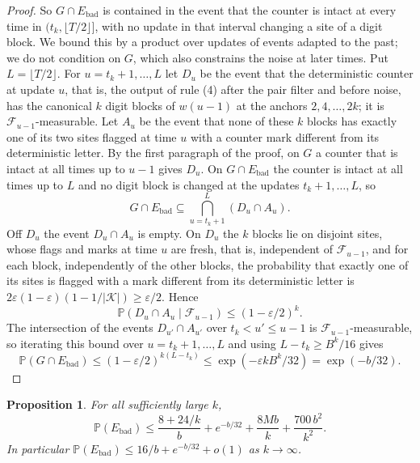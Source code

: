 \documentclass[11pt]{article}
\theoremstyle{plain}
\newtheorem{proposition}[theorem]{Proposition}
\theoremstyle{definition}
\theoremstyle{remark}
\newcommand{\Prob}{\mathbb P}
\newcommand{\eps}{\varepsilon}
\newcommand{\Ks}{\mathcal K}
\newcommand{\cF}{\mathcal F}
\begin{document}
\begin{proof}
So $G\cap E_{\mathrm{bad}}$ is contained in the event that the counter is intact at every time in $(t_k,\lfloor T/2\rfloor]$, with no update in that interval changing a site of a digit block. We bound this by a product over updates of events adapted to the past; we do not condition on $G$, which also constrains the noise at later times. Put $L=\lfloor T/2\rfloor$. For $u=t_k+1,\dots,L$ let $D_u$ be the event that the deterministic counter at update $u$, that is, the output of rule (4) after the pair filter and before noise, has the canonical $k$ digit blocks of $w(u-1)$ at the anchors $2,4,\dots,2k$; it is $\cF_{u-1}$-measurable. Let $A_u$ be the event that none of these $k$ blocks has exactly one of its two sites flagged at time $u$ with a counter mark different from its deterministic letter. By the first paragraph of the proof, on $G$ a counter that is intact at all times up to $u-1$ gives $D_u$. On $G\cap E_{\mathrm{bad}}$ the counter is intact at all times up to $L$ and no digit block is changed at the updates $t_k+1,\dots,L$, so
\[
G\cap E_{\mathrm{bad}}\subseteq\bigcap_{u=t_k+1}^{L}(D_u\cap A_u).
\]
Off $D_u$ the event $D_u\cap A_u$ is empty. On $D_u$ the $k$ blocks lie on disjoint sites, whose flags and marks at time $u$ are fresh, that is, independent of $\cF_{u-1}$, and for each block, independently of the other blocks, the probability that exactly one of its sites is flagged with a mark different from its deterministic letter is ${2\eps(1-\eps)(1-1/|\Ks|)}\ge\eps/2$. Hence
\[
\Prob(D_u\cap A_u\mid\cF_{u-1})\le(1-\eps/2)^k .
\]
The intersection of the events $D_{u'}\cap A_{u'}$ over $t_k<u'\le u-1$ is $\cF_{u-1}$-measurable, so iterating this bound over $u=t_k+1,\dots,L$ and using $L-t_k\ge B^k/16$ gives
\[
\Prob(G\cap E_{\mathrm{bad}})\le(1-\eps/2)^{k(L-t_k)}\le\exp(-\eps kB^k/32)=\exp(-b/32).
\]
\end{proof}

\begin{proposition}\label{prop:ebad}
For all sufficiently large $k$,
\[
\Prob(E_{\mathrm{bad}})\le\frac{8+24/k}{b}+e^{-b/32}+\frac{8Mb}{k}+\frac{700\,b^2}{k^2}.
\]
In particular $\Prob(E_{\mathrm{bad}})\le16/b+e^{-b/32}+o(1)$ as $k\to\infty$.
\end{proposition}
\end{document}
